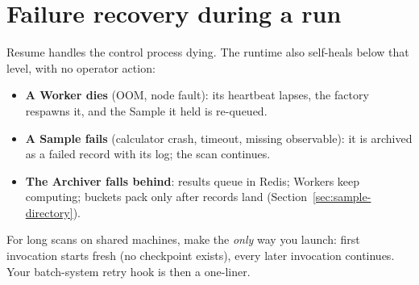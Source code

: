 \section{Failure recovery during a run}
\label{sec:failure-recovery}

Resume handles the control process dying. The runtime also self-heals below that
level, with no operator action:

\begin{itemize}
  \item \textbf{A Worker dies} (OOM, node fault): its heartbeat lapses, the factory
        respawns it, and the Sample it held is re-queued.
  \item \textbf{A Sample fails} (calculator crash, timeout, missing observable): it is
        archived as a failed record with its log; the scan continues.
  \item \textbf{The Archiver falls behind}: results queue in Redis; Workers keep
        computing; buckets pack only after records land
        (Section~\ref{sec:sample-directory}).
\end{itemize}

\begin{jtip}
For long scans on shared machines, make  the
\emph{only} way you launch: first invocation starts fresh (no checkpoint exists),
every later invocation continues. Your batch-system retry hook is then a one-liner.
\end{jtip}
